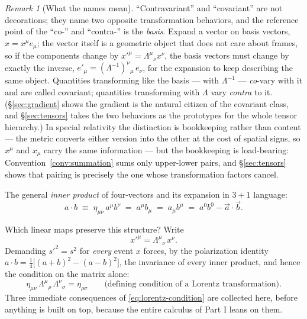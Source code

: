\documentclass[11pt]{article}
\theoremstyle{plain}
\theoremstyle{definition}
\theoremstyle{remark}
\newtheorem{remark}[theorem]{Remark}
\begin{document}
\begin{remark}[What the names mean]\label{rem:contra-co}
``Contravariant'' and ``covariant'' are not decorations; they name two
opposite transformation behaviors, and the reference point of the
``co-'' and ``contra-'' is the \emph{basis}. Expand a vector on basis
vectors, $x = x^\mu e_\mu$; the vector itself is a geometric object
that does not care about frames, so if the components change by
$x'^\mu = \Lambda^\mu{}_\nu x^\nu$, the basis vectors must change by
exactly the inverse, $e'_\mu = (\Lambda^{-1})^\nu{}_\mu\, e_\nu$, for
the expansion to keep describing the same object. Quantities
transforming like the basis --- with $\Lambda^{-1}$ --- \emph{co}-vary
with it and are called covariant; quantities transforming with
$\Lambda$ vary \emph{contra} to it. (\S\ref{sec:gradient} shows the
gradient is the natural citizen of the covariant class, and
\S\ref{sec:tensors} takes the two behaviors as the prototypes for the
whole tensor hierarchy.) In special relativity the distinction is
bookkeeping rather than content --- the metric converts either version
into the other at the cost of spatial signs, so $x^\mu$ and $x_\mu$
carry the same information --- but the bookkeeping is load-bearing:
Convention~\ref{conv:summation} sums only upper-lower pairs, and
\S\ref{sec:tensors} shows that pairing is precisely the one whose
transformation factors cancel.
\end{remark}

\noindent
The general \emph{inner product} of four-vectors
and its expansion in $3+1$ language:
\begin{equation}
  \boxed{\;
  a \cdot b \;\equiv\; \eta_{\mu\nu}\, a^\mu b^\nu
  \;=\; a^\mu b_\mu \;=\; a_\mu b^\mu
  \;=\; a^0 b^0 - \vec a \cdot \vec b .
  \;}
  \label{eq:inner-product}
\end{equation}

Which linear maps preserve this structure? Write
\begin{equation}
  x'^\mu = \Lambda^\mu{}_\nu\, x^\nu .
\end{equation}
Demanding $s'^2 = s^2$ for \emph{every} event $x$ forces, by the
polarization identity
$a \cdot b = \tfrac14\bigl[(a+b)^2 - (a-b)^2\bigr]$, the invariance of
every inner product, and hence the condition on the matrix alone:
\begin{equation}
  \boxed{\;
  \eta_{\mu\nu}\, \Lambda^\mu{}_\rho\, \Lambda^\nu{}_\sigma
  = \eta_{\rho\sigma}
  \qquad\text{(defining condition of a Lorentz transformation).}
  \;}
  \label{eq:lorentz-condition}
\end{equation}
Three immediate consequences of \eqref{eq:lorentz-condition} are
collected here, before anything is built on top, because the entire
calculus of Part I leans on them.
\end{document}
